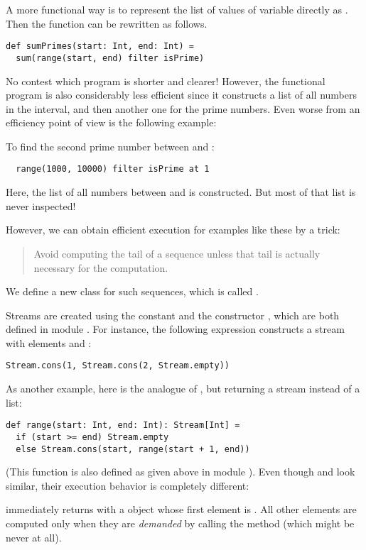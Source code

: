 {A more functional way is to represent the list of values of variable  directly as . Then the function can be rewritten as follows.
\begin{lstlisting}
def sumPrimes(start: Int, end: Int) =
  sum(range(start, end) filter isPrime)
\end{lstlisting}

No contest which program is shorter and clearer!  However, the
functional program is also considerably less efficient since it
constructs a list of all numbers in the interval, and then another one
for the prime numbers. Even worse from an efficiency point of view is
the following example:

To find the second prime number between  and :
\begin{lstlisting}
  range(1000, 10000) filter isPrime at 1
\end{lstlisting}
Here, the list of all numbers between  and  is
constructed.  But most of that list is never inspected!

However, we can obtain efficient execution for examples like these by
a trick:
\begin{quote}
 Avoid computing the tail of a sequence unless that tail is actually
     necessary for the computation.
\end{quote}
We define a new class for such sequences, which is called .

Streams are created using the constant  and the constructor ,
which are both defined in module . For instance, the following
expression constructs a stream with elements  and :
\begin{lstlisting}
Stream.cons(1, Stream.cons(2, Stream.empty))
\end{lstlisting}
As another example, here is the analogue of ,
but returning a stream instead of a list:
\begin{lstlisting}
def range(start: Int, end: Int): Stream[Int] =
  if (start >= end) Stream.empty
  else Stream.cons(start, range(start + 1, end))
\end{lstlisting}
(This function is also defined as given above in module
).  Even though  and 
look similar, their execution behavior is completely different: 

 immediately returns with a  object
whose first element is .  All other elements are computed
only when they are \emph{demanded} by calling the  method
(which might be never at all).  

}
